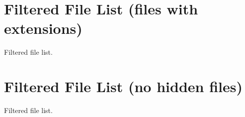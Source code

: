 \documentclass{article}
\begin{document}
\expandafter\docsvlist\expandafter{\result}

\section{Filtered File List (files with extensions)}

Filtered file list.

\expandafter\docsvlist\expandafter{\result}

\section{Filtered File List (no hidden files)}

Filtered file list.

\expandafter\docsvlist\expandafter{\result}
\end{document}
